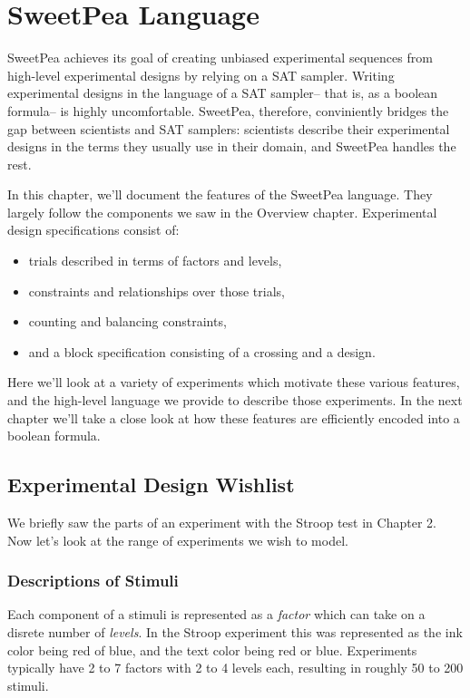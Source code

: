 
\chapter{SweetPea Language}

SweetPea achieves its goal of creating unbiased experimental sequences from high-level experimental designs by relying on a SAT sampler. Writing experimental designs in the language of a SAT sampler-- that is, as a boolean formula-- is highly uncomfortable. SweetPea, therefore, conviniently bridges the gap between scientists and SAT samplers: scientists describe their experimental designs in the terms they usually use in their domain, and SweetPea handles the rest.

In this chapter, we'll document the features of the SweetPea language. They largely follow the components we saw in the Overview chapter. Experimental design specifications consist of:
\begin{itemize}
  \item trials described in terms of factors and levels,
  \item constraints and relationships over those trials,
  \item counting and balancing constraints,
  \item and a block specification consisting of a crossing and a design.
\end{itemize}

Here we'll look at a variety of experiments which motivate these various features, and the high-level language we provide to describe those experiments. In the next chapter we'll take a close look at how these features are efficiently encoded into a boolean formula.


\section{Experimental Design Wishlist}

We briefly saw the parts of an experiment with the Stroop test in Chapter 2. Now let's look at the range of experiments we wish to model.

\subsection{Descriptions of Stimuli}

Each component of a stimuli is represented as a \emph{factor} which can take on a disrete number of \emph{levels}. In the Stroop experiment this was represented as the ink color being red of blue, and the text color being red or blue. Experiments typically have 2 to 7 factors with 2 to 4 levels each, resulting in roughly 50 to 200 stimuli.

